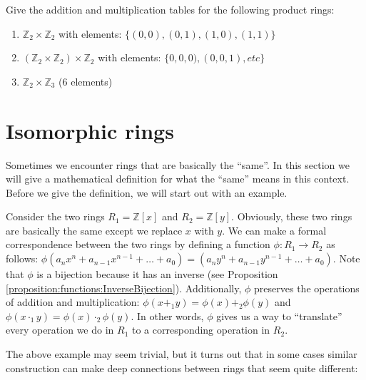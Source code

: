 \begin{exercise}{}
Give the addition and multiplication tables for the following product rings:
\begin{enumerate}
\item ${\mathbb Z}_2\times {\mathbb Z}_2$ with elements: $\{(0,0),(0,1),(1,0),(1,1)\}$ 
\item $({\mathbb Z}_2\times {\mathbb Z}_2)\times {\mathbb Z}_2$ with elements: $\{0,0,0),(0,0,1),etc\}$
\item ${\mathbb Z}_2\times {\mathbb Z}_3$ (6 elements)
\end{enumerate}
\end{exercise}

\section{Isomorphic rings}
\label{sec:Rings:IsomorphicRings}

Sometimes we encounter rings that are basically the ``same''.  In this section we will give a mathematical definition for what the ``same'' means in this context.  Before we give the definition, we will start out with an example.

\begin{example}{}
Consider the two rings $R_1={\mathbb Z}[x]$ and $R_2={\mathbb Z}[y]$.  Obviously, these two rings are basically the same except we replace $x$ with $y$.  We can make a formal correspondence between the two rings by defining a function $\phi:R_1\rightarrow R_2$ as follows: $\phi(a_nx^n+a_{n-1}x^{n-1}+\ldots +a_0)=(a_ny^n+a_{n-1}y^{n-1}+\ldots +a_0)$.  Note that $\phi$ is a bijection because it has an inverse (see Proposition \ref{proposition:functions:InverseBijection}).  Additionally, $\phi$ preserves the operations of addition and multiplication:  $\phi(x+_1y)=\phi(x)+_2\phi(y)$ and
$\phi(x\cdot_1y)=\phi(x)\cdot_2\phi(y)$.  In other words, $\phi$ gives us a way to ``translate'' every operation we do in $R_1$ to a corresponding operation in $R_2$.
\end{example}
The above example may seem trivial, but it turns out that in some cases similar construction can make deep connections between rings that seem quite different:


